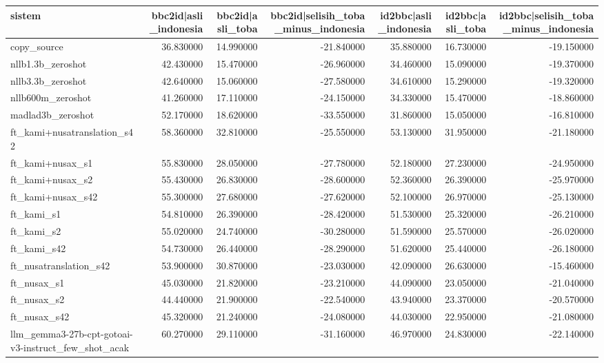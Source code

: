 \begin{tabular}{lrrrrrr}
\toprule
sistem & bbc2id|asli\_indonesia & bbc2id|asli\_toba & bbc2id|selisih\_toba\_minus\_indonesia & id2bbc|asli\_indonesia & id2bbc|asli\_toba & id2bbc|selisih\_toba\_minus\_indonesia \\
\midrule
copy\_source & 36.830000 & 14.990000 & -21.840000 & 35.880000 & 16.730000 & -19.150000 \\
nllb1.3b\_zeroshot & 42.430000 & 15.470000 & -26.960000 & 34.460000 & 15.090000 & -19.370000 \\
nllb3.3b\_zeroshot & 42.640000 & 15.060000 & -27.580000 & 34.610000 & 15.290000 & -19.320000 \\
nllb600m\_zeroshot & 41.260000 & 17.110000 & -24.150000 & 34.330000 & 15.470000 & -18.860000 \\
madlad3b\_zeroshot & 52.170000 & 18.620000 & -33.550000 & 31.860000 & 15.050000 & -16.810000 \\
ft\_kami+nusatranslation\_s42 & 58.360000 & 32.810000 & -25.550000 & 53.130000 & 31.950000 & -21.180000 \\
ft\_kami+nusax\_s1 & 55.830000 & 28.050000 & -27.780000 & 52.180000 & 27.230000 & -24.950000 \\
ft\_kami+nusax\_s2 & 55.430000 & 26.830000 & -28.600000 & 52.360000 & 26.390000 & -25.970000 \\
ft\_kami+nusax\_s42 & 55.300000 & 27.680000 & -27.620000 & 52.100000 & 26.970000 & -25.130000 \\
ft\_kami\_s1 & 54.810000 & 26.390000 & -28.420000 & 51.530000 & 25.320000 & -26.210000 \\
ft\_kami\_s2 & 55.020000 & 24.740000 & -30.280000 & 51.590000 & 25.570000 & -26.020000 \\
ft\_kami\_s42 & 54.730000 & 26.440000 & -28.290000 & 51.620000 & 25.440000 & -26.180000 \\
ft\_nusatranslation\_s42 & 53.900000 & 30.870000 & -23.030000 & 42.090000 & 26.630000 & -15.460000 \\
ft\_nusax\_s1 & 45.030000 & 21.820000 & -23.210000 & 44.090000 & 23.050000 & -21.040000 \\
ft\_nusax\_s2 & 44.440000 & 21.900000 & -22.540000 & 43.940000 & 23.370000 & -20.570000 \\
ft\_nusax\_s42 & 45.320000 & 21.240000 & -24.080000 & 44.030000 & 22.950000 & -21.080000 \\
llm\_gemma3-27b-cpt-gotoai-v3-instruct\_few\_shot\_acak & 60.270000 & 29.110000 & -31.160000 & 46.970000 & 24.830000 & -22.140000 \\

\end{tabular}
